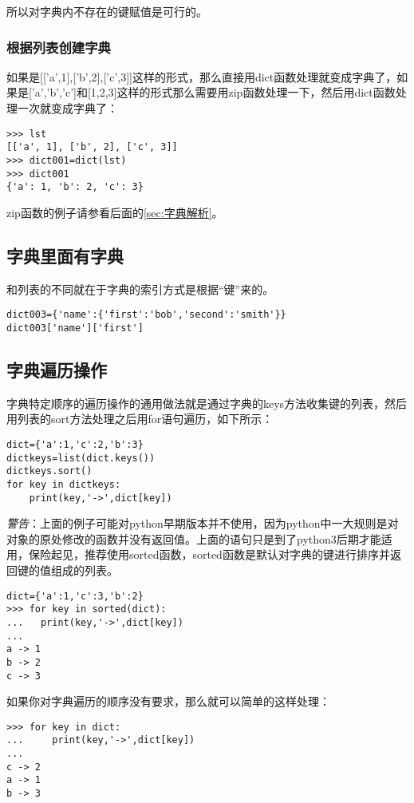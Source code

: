 \documentclass[12pt,oneside]{book}
\begin{document}
\begin{common-format}
所以对字典内不存在的键赋值是可行的。

\subsubsection{根据列表创建字典}
如果是[['a',1],['b',2],['c',3]]这样的形式，那么直接用dict函数处理就变成字典了，如果是['a','b','c']和[1,2,3]这样的形式那么需要用zip函数处理一下，然后用dict函数处理一次就变成字典了：
\begin{Verbatim}
>>> lst
[['a', 1], ['b', 2], ['c', 3]]
>>> dict001=dict(lst)
>>> dict001
{'a': 1, 'b': 2, 'c': 3}
\end{Verbatim}

zip函数的例子请参看后面的\ref{sec:字典解析}。



\subsection{字典里面有字典}
和列表的不同就在于字典的索引方式是根据“键”来的。
\begin{Verbatim}
dict003={'name':{'first':'bob','second':'smith'}}
dict003['name']['first']
\end{Verbatim}

\subsection{字典遍历操作}
字典特定顺序的遍历操作的通用做法就是通过字典的keys方法收集键的列表，然后用列表的sort方法处理之后用for语句遍历，如下所示：
\begin{Verbatim}
dict={'a':1,'c':2,'b':3}
dictkeys=list(dict.keys())
dictkeys.sort()
for key in dictkeys:
    print(key,'->',dict[key])
\end{Verbatim}

\emph{警告}：上面的例子可能对python早期版本并不使用，因为python中一大规则是对对象的原处修改的函数并没有返回值。上面的语句只是到了python3后期才能适用，保险起见，推荐使用sorted函数，sorted函数是默认对字典的键进行排序并返回键的值组成的列表。
\begin{Verbatim}
dict={'a':1,'c':3,'b':2}
>>> for key in sorted(dict):
...   print(key,'->',dict[key])
... 
a -> 1
b -> 2
c -> 3
\end{Verbatim}


如果你对字典遍历的顺序没有要求，那么就可以简单的这样处理：
\begin{Verbatim}
>>> for key in dict:
...     print(key,'->',dict[key])
... 
c -> 2
a -> 1
b -> 3
\end{Verbatim}



\end{common-format}
\end{document}

